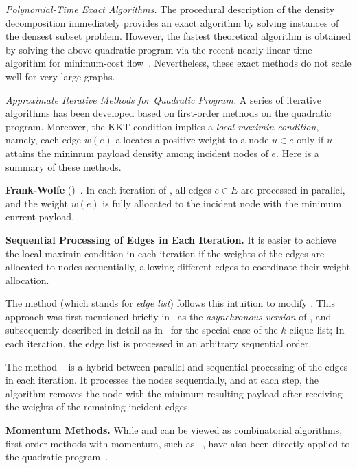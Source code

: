 \noindent \emph{Polynomial-Time Exact Algorithms.}
The procedural description of the density decomposition
immediately provides an exact algorithm by solving instances
of the densest subset problem.
However, the fastest theoretical algorithm is obtained by
solving the above quadratic program via
the recent nearly-linear time algorithm for minimum-cost flow~\cite{DBLP:conf/focs/ChenKLPGS22}.  Nevertheless, these exact methods
do not scale well for very large graphs.


\noindent \emph{Approximate Iterative Methods for
Quadratic Program.}  A series of iterative algorithms 
has been developed based on first-order methods on the quadratic program.
Moreover, the KKT condition implies a \emph{local maximin condition},
namely, each edge $w(e)$ allocates a positive weight 
to a node $u \in e$ only if $u$ attains the minimum payload density
among incident nodes of $e$.  Here is a summary
of these methods.

\begin{compactitem}

\item \textbf{Frank-Wolfe} (\fw)~\cite{DBLP:conf/www/DanischCS17}.
In each iteration of \fw, all edges $e \in E$ are processed in parallel, and the weight $w(e)$ is fully allocated to the incident node with the minimum current payload.




\item \textbf{Sequential Processing of Edges in Each Iteration.} 
It is easier to achieve the local maximin condition in each iteration if the weights of the edges are allocated to nodes sequentially, allowing different edges to coordinate their weight allocation.



The method \elist (which stands for \emph{edge list}) follows this intuition 
to modify \fw.
This approach was first mentioned briefly in~\cite{DBLP:conf/www/DanischCS17} as the \emph{asynchronous version} of \fw,
and subsequently described in detail as \kclist 
in~\cite{DBLP:journals/pvldb/SunDCS20}
for the special case of the $k$-clique list;
In each iteration, the edge list is processed in an arbitrary sequential order.


The method \greedypp~\cite{DBLP:conf/www/BoobGPSTWW20}
is a hybrid between parallel and sequential processing of the edges in each iteration. It processes the nodes sequentially, and at each step, the algorithm removes the node with the minimum resulting payload after receiving the weights of the remaining incident edges.


\item \textbf{Momentum Methods.} While \elist and \greedypp can be viewed as combinatorial algorithms, first-order methods with momentum, such as 
\fista~\cite{beck2009fast}, have also been directly applied to the 
quadratic program~\cite{DBLP:conf/nips/HarbQC22}.


\end{compactitem}


